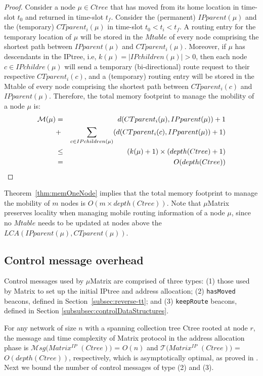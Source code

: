\begin{proof}
Consider a node $\mu \in Ctree$ that has moved from its home location in time-slot $t_0$ and returned in time-slot $t_f$. Consider the (permanent) $IPparent(\mu)$ and the (temporary) $CTparent_{i}(\mu)$ in time-slot $t_0 < t_i < t_f$. A routing entry for the temporary location of $\mu$ will be stored in the $Mtable$ of every node comprising the shortest path between $IPparent(\mu)$ and $CTparent_{i}(\mu)$. Moreover, if $\mu$ has descendants in the IPtree, i.e, $k(\mu)=|IPchildren(\mu)|>0$, then each node $c\in IPchildre(\mu)$ will send a temporary (bi-directional) route request to their respective $CTparent_{i}(c)$, and a (temporary) routing entry will be stored in the Mtable of every node comprising the shortest path between $CTparent_{i}(c)$ and $IPparent(\mu)$. Therefore, the total memory footprint to manage the mobility of a node $\mu$ is:
\begin{eqnarray*}
    \mathcal{M}(\mu) & = &  d(CTparent_{i}(\mu), IPparent(\mu)) + 1 \nonumber \\
                     & + & \sum_{c \in IPchildren(\mu)} (d(CTparent_{i}(c), IPparent(\mu))+1) \nonumber \\
                    & \leq & (k(\mu)+1) \times (depth(Ctree)+1) \nonumber \\
                    &=& O(depth(Ctree)) \qedhere \nonumber
\end{eqnarray*}
\end{proof}

Theorem~\ref{thm:memOneNode} implies that the total memory footprint to manage the mobility of $m$ nodes is $O(m \times depth(Ctree))$. Note that $\mu$Matrix preserves locality when managing mobile routing information of a node $\mu$, since no $Mtable$ needs to be updated at nodes above the $LCA(IPparent(\mu),CTparent(\mu))$.

\subsection{Control message overhead}
\label{subsec:control-message-overhead}

Control messages used by $\mu$Matrix are comprised of three types: (1) those used by Matrix to set up the initial IPtree and address allocation; (2) \texttt{hasMoved} beacons, defined in Section~\ref{subsec:reverse-tt}; and (3) \texttt{keepRoute} beacons, defined in Section \ref{subsubsec:controlDataStructures}. 

For any network of size $n$ with a spanning collection tree Ctree rooted at node $r$, the message and time complexity of Matrix protocol in the address allocation phase is $\mathcal{M}sg(Matrix^{IP}$ $(Ctree))$ = $O(n)$ and $\mathcal{T}(Matrix^{IP}$ $(Ctree))$ = $O(depth(Ctree))$, respectively, which is asymptotically optimal, as proved in \cite{Peres:2016}. Next we bound the number of control messages of type (2) and (3).

